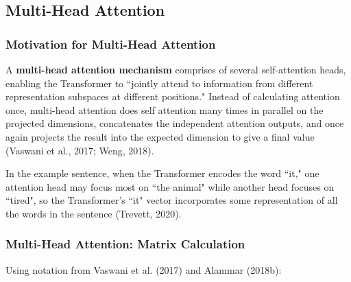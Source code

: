 \subsection{Multi-Head Attention} \label{sec:MultiHeadAttention}

\subsubsection{Motivation for Multi-Head Attention}



A \textbf{multi-head attention mechanism} comprises of several self-attention heads, enabling the Transformer to ``jointly attend to information from different representation subspaces at different positions." Instead of calculating attention once, multi-head attention does self attention many times in parallel on the projected dimensions, concatenates the independent attention outputs, and once again projects the result into the expected dimension to give a final value (Vaswani et al., 2017; Weng, 2018).  


In the example sentence, when the Transformer encodes the word ``it," one attention head may focus most on ``the animal" while another head focuses on ``tired", so the Transformer's ``it" vector incorporates some representation of all the words in the sentence (Trevett, 2020). 

\subsubsection{Multi-Head Attention: Matrix Calculation}

Using notation from Vaswani et al. (2017) and Alammar (2018b): 


